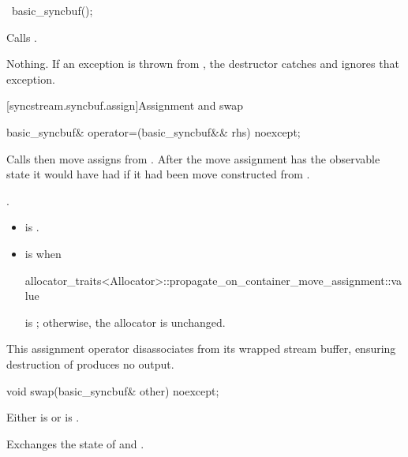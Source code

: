 %
\begin{itemdecl}
~basic_syncbuf();
\end{itemdecl}

\begin{itemdescr}
\pnum
\effects
Calls .

\pnum
\throws
Nothing.
If an exception is thrown from ,
the destructor catches and ignores that exception.
\end{itemdescr}

[syncstream.syncbuf.assign]{Assignment and swap}

%
\begin{itemdecl}
basic_syncbuf& operator=(basic_syncbuf&& rhs) noexcept;
\end{itemdecl}

\begin{itemdescr}
\pnum
\effects
Calls  then
move assigns from .
After the move assignment 
has the observable state it would have had if
it had been move constructed from .

\pnum
\returns
{}.

\pnum
\ensures
\begin{itemize}
\item
{} is .
\item
{} is  when
\begin{codeblock}
allocator_traits<Allocator>::propagate_on_container_move_assignment::value
\end{codeblock}
is ; otherwise, the allocator is unchanged.
\end{itemize}

\pnum
\remarks
This assignment operator disassociates 
from its wrapped stream buffer,
ensuring destruction of  produces no output.
\end{itemdescr}

%
\begin{itemdecl}
void swap(basic_syncbuf& other) noexcept;
\end{itemdecl}

\begin{itemdescr}
\pnum
\requires
Either
is 
or
is .

\pnum
\effects
Exchanges the state of  and .
\end{itemdescr}

